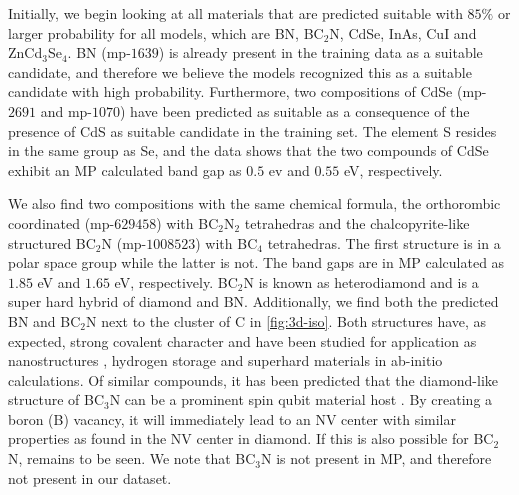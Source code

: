 




\noindent Initially, we begin looking at all materials that are predicted suitable with $85\%$ or larger probability for all models, which are BN, BC$_2$N, CdSe, InAs, CuI and ZnCd$_3$Se$_4$. BN (mp-$1639$) is already present in the training data as a suitable candidate, and therefore we believe the models recognized this as a suitable candidate with high probability. Furthermore, two compositions of CdSe (mp-$2691$ and mp-$1070$) have been predicted as suitable as a consequence of the presence of CdS as suitable candidate in the training set. The element S resides in the same group as Se, and the data shows that the two compounds of CdSe exhibit an MP calculated band gap as $0.5$ ev and $0.55$ eV, respectively.

We also find two compositions with the same chemical formula, the orthorombic coordinated (mp-$629458$) with BC$_2$N$_2$ tetrahedras and the chalcopyrite-like structured BC$_2$N (mp-$1008523$) with BC$_4$ tetrahedras. The first structure is in a polar space group while the latter is not. The band gaps are in MP calculated as $1.85$ eV and $1.65$ eV, respectively. BC$_2$N is known as heterodiamond and is a super hard hybrid of diamond and BN. Additionally, we find both the predicted BN and BC$_2$N next to the cluster of C in \autoref{fig:3d-iso}.
Both structures have, as expected, strong covalent character and have been studied for application as nanostructures \cite{Gao2017}, hydrogen storage \cite{Cai2017} and superhard materials \cite{Li2017, Jiang2020} in ab-initio calculations. Of similar compounds, it has been predicted that the diamond-like structure of BC$_3$N can be a prominent spin qubit material host \cite{WangDuo2020Sqbo}. By creating a boron (B) vacancy, it will immediately lead to an NV center with similar properties as found in the NV center in diamond. If this is also possible for BC$_2$N, remains to be seen. We note that BC$_3$N is not present in MP, and therefore not present in our dataset.

